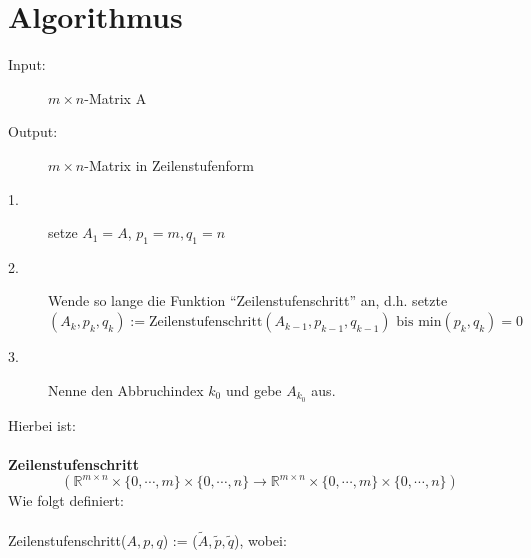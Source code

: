 \documentclass{scrbook}
\begin{document}
\section{Algorithmus}
\begin{description}
\item[Input:] \(m\times n\)-Matrix A
\item[Output:]\(m\times n\)-Matrix in Zeilenstufenform\\
\end{description}
\begin{description}
\item[1.] setze \(A_1 = A \), \(p_1=m, q_1 = n\)
\item[2.] Wende so lange die Funktion "`Zeilenstufenschritt"' an, d.h. setzte\\
\(
(A_k,p_k,q_k):= \text{Zeilenstufenschritt} (A_{k-1},p_{k-1},q_{k-1}) \text{ bis min}(p_k,q_k)=0
\)
\item[3.] Nenne den Abbruchindex \(k_0\) und gebe \(A_{k_0}\) aus.\\
\end{description}
Hierbei ist:\\
\\
\textbf{Zeilenstufenschritt}
\[(\mathbb{R}^{m\times n} \times \{0,\cdots ,m\}\times \{0,\cdots ,n\}\rightarrow \mathbb{R}^{m\times n} \times \{0,\cdots ,m\}\times \{0,\cdots ,n\})
\]
Wie folgt definiert:\\
\\
Zeilenstufenschritt(\(A,p,q\)) := (\(\tilde{A},\tilde{p},\tilde{q}\)), wobei:
\end{document}
